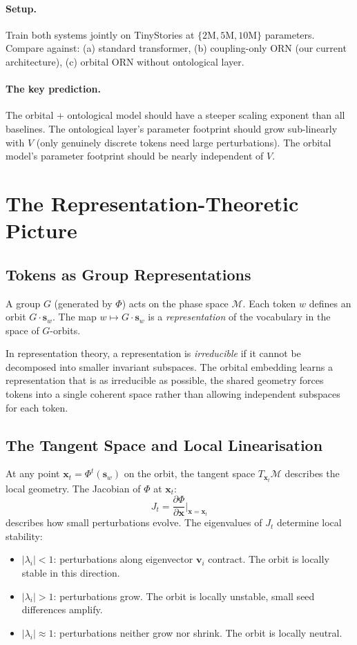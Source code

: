 \documentclass[11pt, a4paper]{article}
\newcommand{\x}{\mathbf{x}}
\newcommand{\s}{\mathbf{s}}
\newcommand{\calM}{\mathcal{M}}
\theoremstyle{remark}
\begin{document}
\paragraph{Setup.}
Train both systems jointly on TinyStories at $\{2\text{M}, 5\text{M}, 10\text{M}\}$ parameters.
Compare against: (a) standard transformer, (b) coupling-only ORN (our current architecture), (c) orbital ORN without ontological layer.

\paragraph{The key prediction.}
The orbital + ontological model should have a steeper scaling exponent than all baselines.
The ontological layer's parameter footprint should grow sub-linearly with $V$ (only genuinely discrete tokens need large perturbations).
The orbital model's parameter footprint should be nearly independent of $V$.


\section{The Representation-Theoretic Picture}

\subsection{Tokens as Group Representations}

A group $G$ (generated by $\Phi$) acts on the phase space $\calM$.
Each token $w$ defines an orbit $G \cdot \s_w$.
The map $w \mapsto G \cdot \s_w$ is a \emph{representation} of the vocabulary in the space of $G$-orbits.

In representation theory, a representation is \emph{irreducible} if it cannot be decomposed into smaller invariant subspaces.
The orbital embedding learns a representation that is as irreducible as possible, the shared geometry forces tokens into a single coherent space rather than allowing independent subspaces for each token.

\subsection{The Tangent Space and Local Linearisation}

At any point $\x_t = \Phi^t(\s_w)$ on the orbit, the tangent space $T_{\x_t}\calM$ describes the local geometry.
The Jacobian of $\Phi$ at $\x_t$:
\[
    J_t = \frac{\partial \Phi}{\partial \x}\bigg|_{\x = \x_t}
\]
describes how small perturbations evolve.
The eigenvalues of $J_t$ determine local stability:
\begin{itemize}[nosep]
    \item $|\lambda_i| < 1$: perturbations along eigenvector $\mathbf{v}_i$ contract. The orbit is locally stable in this direction.
    \item $|\lambda_i| > 1$: perturbations grow. The orbit is locally unstable, small seed differences amplify.
    \item $|\lambda_i| \approx 1$: perturbations neither grow nor shrink. The orbit is locally neutral.
\end{itemize}
\end{document}
